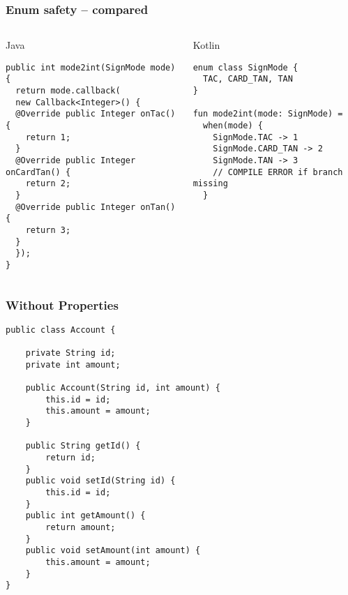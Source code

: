 \begin{frame}[fragile]
\frametitle{Enum safety -- compared}
\begin{columns}[t]
\begin{column}{0.5\textwidth}
\begin{center}
  Java
\end{center}
\begin{lstlisting}[style=twosided]
public int mode2int(SignMode mode) {
  return mode.callback(
  new Callback<Integer>() {
  @Override public Integer onTac() {
    return 1;
  }
  @Override public Integer onCardTan() {
    return 2;
  }
  @Override public Integer onTan() {
    return 3;
  }
  });
}
\end{lstlisting}
\end{column}
\begin{column}{0.5\textwidth}
\begin{center}
  Kotlin
\end{center}
\begin{lstlisting}[style=twosided]
enum class SignMode {
  TAC, CARD_TAN, TAN
}

fun mode2int(mode: SignMode) =
  when(mode) {
    SignMode.TAC -> 1
    SignMode.CARD_TAN -> 2
    SignMode.TAN -> 3
    // COMPILE ERROR if branch missing
  }
\end{lstlisting}
\end{column}
\end{columns}
\end{frame}




\begin{frame}[fragile] \frametitle{Without Properties}
\begin{lstlisting}[basicstyle=\color{IJ_text}\ttfamily\tiny]
public class Account {
    
    private String id;
    private int amount;

    public Account(String id, int amount) {
        this.id = id;
        this.amount = amount;
    }

    public String getId() {
        return id;
    }
    public void setId(String id) {
        this.id = id;
    }
    public int getAmount() {
        return amount;
    }
    public void setAmount(int amount) {
        this.amount = amount;
    }
}
\end{lstlisting}
\end{frame}

